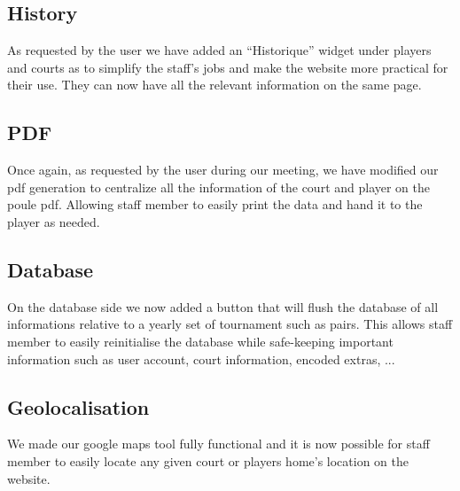 \subsection{History}

As requested by the user we have added an \enquote{Historique} widget under players and courts as to simplify the staff's jobs and make the website more practical for their use. They can now have all the relevant information on the same page.

\subsection{PDF}

Once again, as requested by the user during our meeting, we have modified our pdf generation to centralize all the information of the court and player on the poule pdf. Allowing staff member to easily print the data and hand it to the player as needed.

\subsection{Database}

On the database side we now added a button that will flush the database of all informations relative to a yearly set of tournament such as pairs. This allows staff member to easily reinitialise the database while safe-keeping important information such as user account, court information, encoded extras, ...

\subsection{Geolocalisation}

We made our google maps tool fully functional and it is now possible for staff member to easily locate any given court or players home's location on the website.